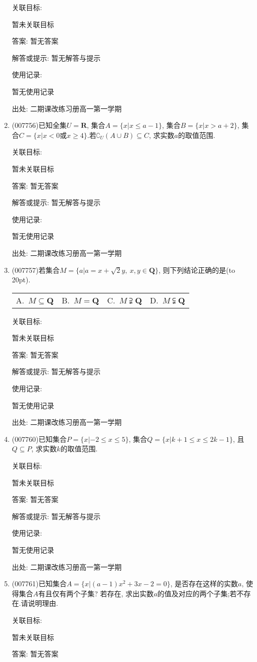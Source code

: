 \documentclass[10pt,a4paper]{article}
\newcommand{\bracket}[1]{(\hbox to #1pt{})}
\newcommand{\fourch}[4]{\par\begin{tabular}{p{.23\textwidth}p{.23\textwidth}p{.23\textwidth}p{.23\textwidth}}
A.~#1 &B.~#2& C.~#3& D.~#4
\end{tabular}}
\begin{document}
\begin{enumerate}[1.]
关联目标:

暂未关联目标

答案: 暂无答案

解答或提示: 暂无解答与提示

使用记录:

暂无使用记录


出处: 二期课改练习册高一第一学期
\item { (007756)}已知全集$U=\mathbf{R}$, 集合$A=\{x|x\le a-1\}$, 集合$B=\{x|x>a+2\}$, 集合$C=\{x|x<0$或$x\ge 4\}$.若$\complement _U(A\cup B)\subseteq C$, 求实数$a$的取值范围.


关联目标:

暂未关联目标

答案: 暂无答案

解答或提示: 暂无解答与提示

使用记录:

暂无使用记录


出处: 二期课改练习册高一第一学期
\item { (007757)}若集合$M=\{a|a=x+\sqrt 2y,\ x,y\in \mathbf{Q}\}$, 则下列结论正确的是\bracket{20}.
\fourch{$M\subseteq \mathbf{Q}$}{$M=\mathbf{Q}$}{$M\supsetneqq \mathbf{Q}$}{$M\subsetneqq \mathbf{Q}$}


关联目标:

暂未关联目标

答案: 暂无答案

解答或提示: 暂无解答与提示

使用记录:

暂无使用记录


出处: 二期课改练习册高一第一学期
\item { (007760)}已知集合$P=\{x|-2\le x\le 5\}$, 集合$Q=\{x|k+1\le x\le 2k-1\}$, 且$Q\subseteq P$, 求实数$k$的取值范围.


关联目标:

暂未关联目标

答案: 暂无答案

解答或提示: 暂无解答与提示

使用记录:

暂无使用记录


出处: 二期课改练习册高一第一学期
\item { (007761)}已知集合$A=\{x|(a-1)x^2+3x-2=0\}$, 是否存在这样的实数$a$, 使得集合$A$有且仅有两个子集? 若存在, 求出实数$a$的值及对应的两个子集;若不存在.请说明理由.


关联目标:

暂未关联目标

答案: 暂无答案


\end{enumerate}
\end{document}
